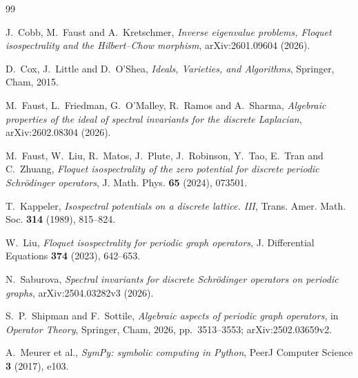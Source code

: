 \documentclass[11pt,reqno]{amsart}
\theoremstyle{definition}
\theoremstyle{remark}
\begin{document}
\begin{thebibliography}{99}

J.~Cobb, M.~Faust and A.~Kretschmer,
\emph{Inverse eigenvalue problems, Floquet isospectrality and the
Hilbert--Chow morphism},
arXiv:2601.09604 (2026).

D.~Cox, J.~Little and D.~O'Shea,
\emph{Ideals, Varieties, and Algorithms},
Springer, Cham, 2015.

M.~Faust, L.~Friedman, G.~O'Malley, R.~Ramos and A.~Sharma,
\emph{Algebraic properties of the ideal of spectral invariants for the
discrete Laplacian},
arXiv:2602.08304 (2026).

M.~Faust, W.~Liu, R.~Matos, J.~Plute, J.~Robinson, Y.~Tao, E.~Tran and
C.~Zhuang,
\emph{Floquet isospectrality of the zero potential for discrete periodic
Schr\"odinger operators},
J. Math. Phys. \textbf{65} (2024), 073501.

T.~Kappeler,
\emph{Isospectral potentials on a discrete lattice. III},
Trans. Amer. Math. Soc. \textbf{314} (1989), 815--824.

W.~Liu,
\emph{Floquet isospectrality for periodic graph operators},
J. Differential Equations \textbf{374} (2023), 642--653.

N.~Saburova,
\emph{Spectral invariants for discrete Schr\"odinger operators on periodic
graphs},
arXiv:2504.03282v3 (2026).

S.~P.~Shipman and F.~Sottile,
\emph{Algebraic aspects of periodic graph operators},
in \emph{Operator Theory}, Springer, Cham, 2026, pp.~3513--3553;
arXiv:2502.03659v2.

A.~Meurer et al.,
\emph{SymPy: symbolic computing in Python},
PeerJ Computer Science \textbf{3} (2017), e103.

\end{thebibliography}
\end{document}
